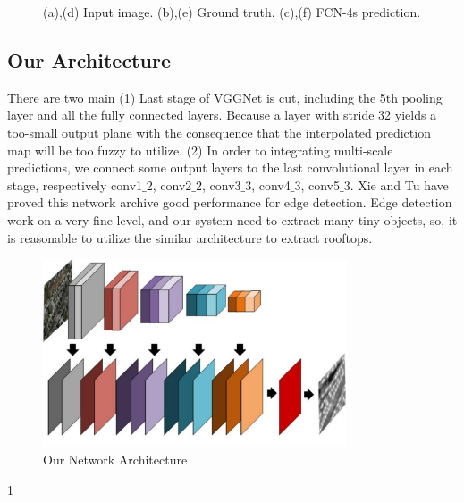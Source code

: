 \documentclass[runningheads]{llncs}
\begin{document}
\begin{figure}
\caption{(a),(d) Input image. (b),(e) Ground truth. (c),(f) FCN-4s prediction.}
\label{FCN4s-results}
\end{figure}
 
\subsection{Our Architecture}  
    There are two main  
   (1) Last stage of VGGNet is cut, including the 5th pooling layer and all the fully connected layers. Because a layer with stride 32 yields a too-small output plane with the consequence that the interpolated prediction map will be too fuzzy to utilize. (2) In order to integrating multi-scale predictions, we connect some output layers to the last convolutional layer in each stage, respectively conv1$\_$2, conv2$\_$2, conv3$\_$3, conv4$\_$3, conv5$\_$3. Xie and Tu \cite{Xie2015Holistically} have proved this network archive good performance for edge detection. Edge detection work on a very fine level, and our system need to extract many tiny objects, so, it is reasonable to utilize the similar architecture to extract rooftops.
 	
\begin{figure}
\centering
\includegraphics[width=90mm]{ourArchitecture}
\caption{Our Network Architecture}
\label{fig:ourArchitecture}
\end{figure}1
\end{document}
